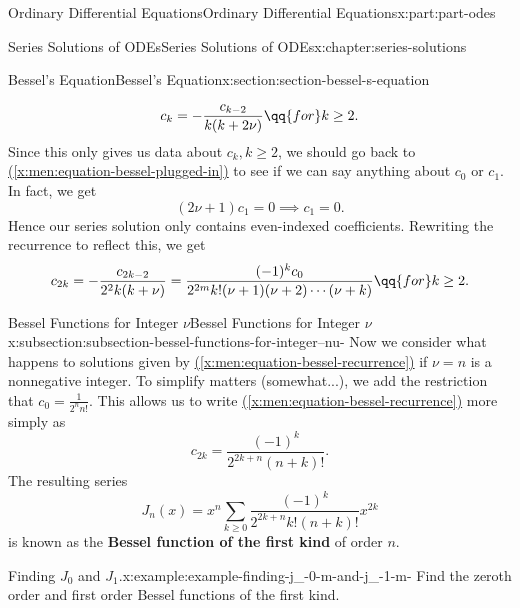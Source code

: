 \documentclass[oneside,10pt,]{book}
\newcommand{\xreffont}{\relax}
\newcommand{\terminology}[1]{\textbf{#1}}
\numberwithin{equation}{part}
\begin{document}
\begin{partptx}{Ordinary Differential Equations}{}{Ordinary Differential Equations}{}{}{x:part:part-odes}
\begin{chapterptx}{Series Solutions of ODEs}{}{Series Solutions of ODEs}{}{}{x:chapter:series-solutions}
\begin{sectionptx}{Bessel's Equation}{}{Bessel's Equation}{}{}{x:section:section-bessel-s-equation}
\begin{introduction}{}
\begin{equation*}
c_{k} = -\frac{c_{k-2}}{k(k+2\nu)}\qq{for}k\geq2\text{.}
\end{equation*}
Since this only gives us data about \(c_{k}, k\geq 2\), we should go back to \hyperref[x:men:equation-bessel-plugged-in]{({\xreffont\ref{x:men:equation-bessel-plugged-in}})} to see if we can say anything about \(c_{0}\) or \(c_{1}\). In fact, we get%
\begin{equation*}
(2\nu + 1)c_{1} = 0 \implies c_{1} = 0\text{.}
\end{equation*}
Hence our series solution only contains even-indexed coefficients. Rewriting the recurrence to reflect this, we get%
\begin{equation}
c_{2k} = -\frac{c_{2k - 2}}{2^{2}k(k + \nu)} = \frac{(-1)^{k}c_{0}}{2^{2m}k!(\nu + 1)(\nu + 2)\cdots(\nu + k)}\qq{for} k\geq2.\label{x:men:equation-bessel-recurrence}
\end{equation}
%
\end{introduction}%
%
%
\typeout{************************************************}
\typeout{************************************************}
%
\begin{subsectionptx}{Bessel Functions for Integer \(\nu\)}{}{Bessel Functions for Integer \(\nu\)}{}{}{x:subsection:subsection-bessel-functions-for-integer--nu-}
Now we consider what happens to solutions given by \hyperref[x:men:equation-bessel-recurrence]{({\xreffont\ref{x:men:equation-bessel-recurrence}})} if \(\nu = n\) is a nonnegative integer. To simplify matters (somewhat...), we add the restriction that \(c_{0} = \frac{1}{2^{n}n!}\). This allows us to write \hyperref[x:men:equation-bessel-recurrence]{({\xreffont\ref{x:men:equation-bessel-recurrence}})} more simply as%
\begin{equation}
c_{2k} = \frac{(-1)^{k}}{2^{2k + n}(n + k)!}.\label{x:men:equation-bessel-function-nu-integer}
\end{equation}
The resulting series%
\begin{equation}
J_{n}(x) = x^{n}\sum_{k\geq0}\frac{(-1)^{k}}{2^{2k + n}k!(n + k)!}x^{2k}\label{x:men:equation-bessel-function-first-kind}
\end{equation}
is known as the \terminology{Bessel function of the first kind} of order \(n\).%
\begin{example}{Finding \(J_{0}\) and \(J_{1}\).}{x:example:example-finding-j_-0-m-and-j_-1-m-}%
Find the zeroth order and first order Bessel functions of the first kind.%

\end{example}
\end{subsectionptx}
\end{sectionptx}
\end{chapterptx}
\end{partptx}
\end{document}
